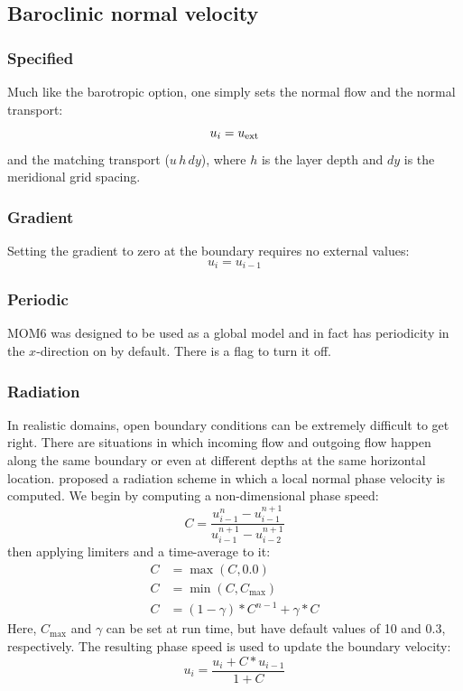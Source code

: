 \documentclass[11pt]{article}
\begin{document}
\subsection{Baroclinic normal velocity}
\subsubsection{Specified}
Much like the barotropic option, one simply sets the normal flow
and the normal transport:
\begin{equation}
  u_{i} = u_{\rm ext}
\end{equation}
and the matching transport ($u \, h \, dy$),
where $h$ is the layer depth and $dy$ is the meridional grid
spacing.

\subsubsection{Gradient}
Setting the gradient to zero at the boundary requires no external values:
\begin{equation}
  u_{i} = u_{i-1}
\end{equation}

\subsubsection{Periodic}
MOM6 was designed to be used as a global model and in fact has
periodicity in the $x$-direction on by default. There is a flag to
turn it off.

\subsubsection{Radiation}
\label{S_rad}
In realistic domains, open boundary conditions can be extremely
difficult to get right. There are situations in which incoming flow and
outgoing flow happen along the same boundary or even at different
depths at the same horizontal location. \citet{Orlanski76}
proposed a radiation scheme in which a local normal phase velocity is
computed. We begin by computing a non-dimensional phase speed:
\begin{equation}
  C = \frac{u^n_{i-1} - u^{n+1}_{i-1}}{u^{n+1}_{i-1} - u^{n+1}_{i-2}}
\end{equation}
then applying limiters and a time-average to it:
\begin{align}
  C &= \max(C, 0.0) \\
  C &= \min(C, C_{\max}) \\
  C &= (1 - \gamma) * C^{n-1} + \gamma * C
\end{align}
Here, $C_{\max}$ and $\gamma$ can be set at run time, but have default
values of 10 and 0.3, respectively. The resulting phase speed is
used to update the boundary velocity:
\begin{equation}
   u_{i} = \frac{u_{i} + C * u_{i-1}}{1 + C}
\label{eqorl}
\end{equation}
\end{document}
